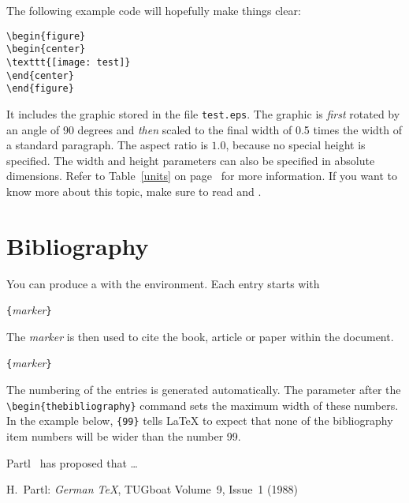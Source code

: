 \pagebreak
The following example code will hopefully make things clear:
\begin{code}
\begin{verbatim}
\begin{figure}
\begin{center}
\texttt{[image: test]}
\end{center}
\end{figure}
\end{verbatim}
\end{code}
It includes the graphic stored in the file \texttt{test.eps}. The
graphic is \emph{first} rotated by an angle of 90 degrees and
\emph{then} scaled to the final width of 0.5 times the width of a
standard paragraph.  The aspect ratio is $1.0$, because no special
height is specified.  The width and height parameters can also be
specified in absolute dimensions. Refer to Table~\ref{units} on
page~\pageref{units} for more information. If you want to know more
about this topic, make sure to read \cite{graphics} and \cite{eps}.

\section{Bibliography}
 
You can produce a  with the 
environment.  Each entry starts with
\begin{lscommand}
\verb|{|\emph{marker}\verb|}|
\end{lscommand}
The \emph{marker} is then used to cite the book, article or paper
within the document.
\begin{lscommand}
\verb|{|\emph{marker}\verb|}|
\end{lscommand}
The numbering of the entries is generated automatically.  The
parameter after the \verb|\begin{thebibliography}| command sets the maximum
width of these numbers. In the example below, \verb|{99}| tells
\LaTeX{} to expect that none of the bibliography item numbers will be
wider than the number 99.
\enlargethispage{2cm}
\begin{example}
Partl~\cite{pa} has 
proposed that \ldots 
\begin{thebibliography}{99}
 H.~Partl: 
\emph{German \TeX},
TUGboat Volume~9, Issue~1 (1988)
\end{thebibliography}
\end{example}

